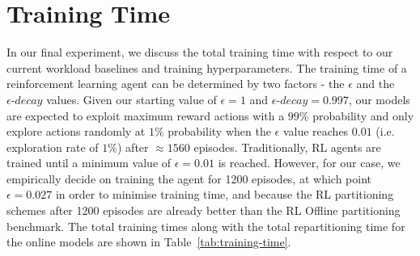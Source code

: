 \section{Training Time}
\label{sec:training-time}
In our final experiment, we discuss the total training time with respect to our current workload baselines and training hyperparameters. The training time of a reinforcement learning agent can be determined by two factors - the $\epsilon$ and the $\epsilon\textit{-decay}$ values. Given our starting value of $\epsilon = 1$  and $\epsilon\textit{-decay} = 0.997$, our models are expected to exploit maximum reward actions with a $99\%$ probability and only explore actions randomly at $1\%$ probability when the $\epsilon$ value reaches $0.01$ (i.e. exploration rate of $1\%$) after $\approx 1560$ episodes. Traditionally, RL agents are trained until a minimum value of $\epsilon = 0.01$ is reached. However, for our case, we empirically decide on training the agent for 1200 episodes, at which point $\epsilon = 0.027$ in order to minimise training time, and because the RL partitioning schemes after 1200 episodes are already better than the RL Offline partitioning benchmark. The total training times along with the total repartitioning time for the online models are shown in Table~\ref{tab:training-time}.
